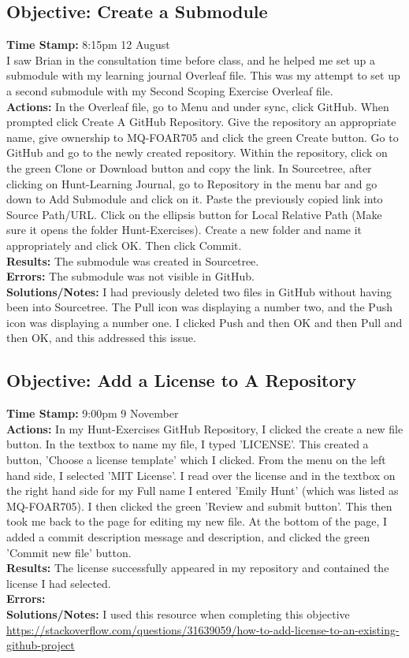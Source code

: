 \documentclass{article}
\begin{document}
\begin{FlushLeft}
\subsection{Objective: Create a Submodule}\label{sec:submodule}
\textbf{Time Stamp:} 8:15pm 12 August\\
I saw Brian in the consultation time before class, and he helped me set up a submodule with my learning journal Overleaf file. This was my attempt to set up a second submodule with my Second Scoping Exercise Overleaf file.\\
\textbf{Actions:} In the Overleaf file, go to Menu and under sync, click GitHub. When prompted click Create A GitHub Repository. Give the repository an appropriate name, give ownership to MQ-FOAR705 and click the green Create button. Go to GitHub and go to the newly created repository. Within the repository, click on the green Clone or Download button and copy the link. In Sourcetree, after clicking on Hunt-Learning Journal, go to Repository in the menu bar and go down to Add Submodule and click on it. Paste the previously copied link into Source Path/URL. Click on the ellipsis button for Local Relative Path (Make sure it opens the folder Hunt-Exercises). Create a new folder and name it appropriately and click OK. Then click Commit.\\
\textbf{Results:} The submodule was created in Sourcetree.\\
\textbf{Errors:} The submodule was not visible in GitHub.\\
\textbf{Solutions/Notes:} I had previously deleted two files in GitHub without having been into Sourcetree. The Pull icon was displaying a number two, and the Push icon was displaying a number one. I clicked Push and then OK and then Pull and then OK, and this addressed this issue.

\subsection{Objective: Add a License to A Repository}
\textbf{Time Stamp:} 9:00pm 9 November\\
\textbf{Actions:} In my Hunt-Exercises GitHub Repository, I clicked the create a new file button. In the textbox to name my file, I typed 'LICENSE'. This created a button, 'Choose a license template' which I clicked. From the menu on the left hand side, I selected 'MIT License'. I read over the license and in the textbox on the right hand side for my Full name I entered 'Emily Hunt' (which was listed as MQ-FOAR705). I then clicked the green 'Review and submit button'. This then took me back to the page for editing my new file. At the bottom of the page, I added a commit description message and description, and clicked the green 'Commit new file' button.\\
\textbf{Results:} The license successfully appeared in my repository and contained the license I had selected.\\
\textbf{Errors:} \\
\textbf{Solutions/Notes:} I used this resource when completing this objective \url{https://stackoverflow.com/questions/31639059/how-to-add-license-to-an-existing-github-project}



\end{FlushLeft}
\end{document}
